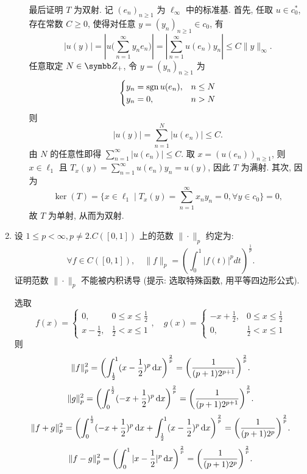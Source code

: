 \begin{enumerate}
\begin{answer}
\begin{enumerate}
        最后证明 $T$ 为双射. 记 $(e_n)_{n\geq 1}$ 为 $\ell_{\infty}$
        中的标准基. 首先, 任取 $u\in c_0^*$, 存在常数 $C\geq 0$, 使得对任意 $y=(y_n)_{n\geq 1}\in c_0$, 有
        \[|u(y)|=\left|u\biggl(\sum_{n=1}^{\infty}y_ne_n\biggr)\right|=\left|\sum_{n=1}^{\infty}u(e_n)y_n\right|\leq C\|y\|_{\infty}.\]
        任意取定 $N\in\Z_+$, 令 $y=(y_n)_{n\geq 1}$ 为
        \[\begin{cases}
            y_n=\mathrm{sgn}\, u(e_n), & n\leq N \\
            y_n=0,           & n>N
        \end{cases}\]
        则
        \[|u(y)|=\sum_{n=1}^N |u(e_n)|\leq C.\]
        由 $N$ 的任意性即得 $\sum_{n=1}^{\infty}|u(e_n)|\leq C$.
        取 $x=(u(e_n))_{n\geq 1}$, 则 $x\in\ell_1$ 且 $T_x(y)=\sum_{n=1}^{\infty}u(e_n)y_n=u(y)$,
        因此 $T$ 为满射. 其次, 因为
        \[\ker(T)=\{x\in\ell_1\mid T_x(y)=\sum_{n=1}^{\infty}x_ny_n=0,\forall y\in c_0\}=0,\]
        故 $T$ 为单射, 从而为双射.
      \end{enumerate}
    \end{answer}
  \item 设 $1 \leq p<\infty, p \neq  2 . C([0,1])$ 上的范数 $\|\cdot\|_{p}$ 约定为:
  \[
    \forall f \in C([0,1]), \quad\|f\|_{p}=\left(\int_{0}^{1}|f(t)|^{p} d t\right)^{\frac{1}{p}} .
  \]
  证明范数 $\|\cdot\|_{p}$ 不能被内积诱导 (提示: 选取特殊函数, 用平等四边形公式).
    \begin{answer}
      选取
      \[f(x)=\begin{cases}
          0, & 0\leq x\leq\frac{1}{2} \\
          x-\frac{1}{2}, & \frac{1}{2}<x\leq 1
      \end{cases},\quad
      g(x)=\begin{cases}
          -x+\frac{1}{2}, & 0\leq x\leq\frac{1}{2} \\
          0, & \frac{1}{2}<x\leq 1
      \end{cases}\]
      则
      \[\|f\|_p^2=\biggl(\int_{\frac{1}{2}}^1 (x-\frac{1}{2})^p\mathop{}\!\mathrm{d} x\biggr)^{\frac{2}{p}}=\biggl(\frac{1}{(p+1)2^{p+1}}\biggr)^{\frac{2}{p}}.\]
      \[\|g\|_p^2=\biggl(\int_0^{\frac{1}{2}} (-x+\frac{1}{2})^p\mathop{}\!\mathrm{d} x\biggr)^{\frac{2}{p}}=\biggl(\frac{1}{(p+1)2^{p+1}}\biggr)^{\frac{2}{p}}.\]
      \[\|f+g\|_p^2=\biggl(\int_0^{\frac{1}{2}}(-x+\frac{1}{2})^p\mathop{}\!\mathrm{d} x+\int_{\frac{1}{2}}^1 (x-\frac{1}{2})^p\mathop{}\!\mathrm{d} x\biggr)^{\frac{2}{p}}=\biggl(\frac{1}{(p+1)2^p}\biggr)^{\frac{2}{p}}.\]
      \[\|f-g\|_p^2=\biggl(\int_0^1 |x-\frac{1}{2}|^p\mathop{}\!\mathrm{d} x\biggr)^{\frac{2}{p}}=\biggl(\frac{1}{(p+1)2^p}\biggr)^{\frac{2}{p}}.\]

\end{answer}
\end{enumerate}

